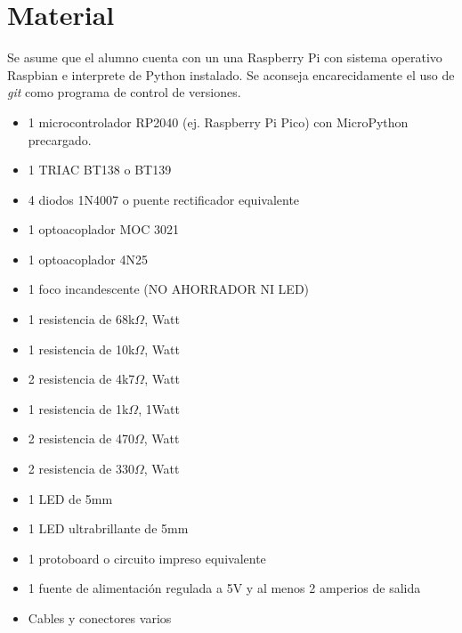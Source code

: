 
%
%
\section{Material}%
\label{sec:material}
Se asume que el alumno cuenta con un una Raspberry Pi con sistema operativo Raspbian e interprete de Python instalado. Se aconseja encarecidamente el uso de \textit{git} como programa de control de versiones.

\begin{itemize}[noitemsep]
	\item 1 microcontrolador RP2040 (ej. Raspberry Pi Pico) con MicroPython precargado.
	\item 1 TRIAC BT138 o BT139
	\item 4 diodos 1N4007 o puente rectificador equivalente
	\item 1 optoacoplador MOC 3021
	\item 1 optoacoplador 4N25
	\item 1 foco incandescente (NO AHORRADOR NI LED)
	\item 1 resistencia de 68k$\Omega$, Watt
	\item 1 resistencia de 10k$\Omega$, Watt
	\item 2 resistencia de 4k7$\Omega$, Watt
	\item 1 resistencia de  1k$\Omega$, 1Watt
	\item 2 resistencia de 470$\Omega$, Watt
	\item 2 resistencia de 330$\Omega$, Watt
	\item 1 LED de 5mm
	\item 1 LED ultrabrillante de 5mm
	\item 1 protoboard o circuito impreso equivalente
	\item 1 fuente de alimentación regulada a 5V y al menos 2 amperios de salida
	\item Cables y conectores varios
\end{itemize}

